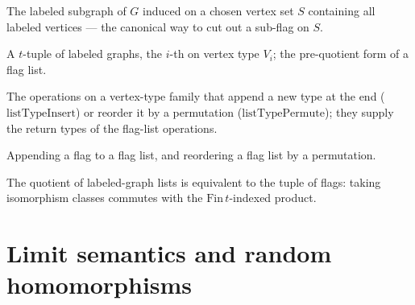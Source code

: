 \begin{definition}
  \label{def:induced-labeled-subgraph}
  \leanok
  The labeled subgraph of $G$ induced on a chosen vertex set $S$ containing all
  labeled vertices --- the canonical way to cut out a sub-flag on $S$.
\end{definition}

\begin{definition}
  \label{def:labeled-graph-list}
  \leanok
  A $t$-tuple of labeled graphs, the $i$-th on vertex type $V_i$; the
  pre-quotient form of a flag list.
\end{definition}

\begin{definition}
  \label{def:list-type-ops}
  \leanok
  The operations on a vertex-type family that append a new type at the end
  ($\mathrm{listTypeInsert}$) or reorder it by a permutation
  ($\mathrm{listTypePermute}$); they supply the return types of the flag-list
  operations.
\end{definition}

\begin{definition}
  \label{def:flag-list-ops}
  \leanok
  Appending a flag to a flag list, and reordering a flag list by a permutation.
\end{definition}

\begin{theorem}
  \label{thm:eqv-quot-list-flaglist}
  \leanok
  The quotient of labeled-graph lists is equivalent to the tuple of flags: taking
  isomorphism classes commutes with the $\mathrm{Fin}\,t$-indexed product.
\end{theorem}


\chapter{Limit semantics and random homomorphisms}
\label{chap:limits}

